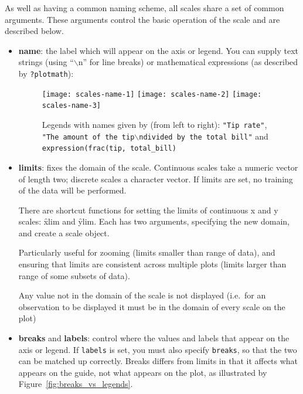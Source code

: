 As well as having a common naming scheme, all scales share a set of common arguments.  These arguments control the basic operation of the scale and are described below.

\begin{itemize}
  \item {\bf name}:  the label which will appear on the axis or legend. You can supply text strings (using ``$\backslash$n'' for line breaks) or mathematical expressions (as described by \verb|?plotmath|):
  
  \begin{figure}[htbp]
    \centering
      \texttt{[image: scales-name-1]}%
      \texttt{[image: scales-name-2]}%
      \texttt{[image: scales-name-3]}
    \caption{Legends with names given by (from left to right): {\tt "Tip rate"}, {\tt "The amount of the tip$\backslash$ndivided by the total bill"} and {\tt expression(frac(tip, total\_bill)} }
    \label{fig:legend-names}
  \end{figure}
  

  \item {\bf limits}: fixes the domain of the scale.   Continuous scales take a numeric vector of length two; discrete scales a character vector. If limits are set, no training of the data will be performed.  
  
  There are shortcut functions for setting the limits of continuous x and y scales: \f{xlim} and \f{ylim}.  Each has two arguments, specifying the new domain, and create a scale object.  
  
  Particularly useful for zooming (limits smaller than range of data), and ensuring that limits are consistent across multiple plots (limits larger than range of some subsets of data).  
  
  Any value not in the domain of the scale is not displayed (i.e.\ for an observation to be displayed it must be in the domain of every scale on the plot)

  \item {\bf breaks} and {\bf labels}: control where the values and labels that appear on the axis or legend. If {\tt labels} is set, you must also specify {\tt breaks}, so that the two can be matched up correctly.  Breaks differs from limits in that it affects what appears on the guide, not what appears on the plot, as illustrated by Figure~\ref{fig:breaks_vs_legends}.
  
\end{itemize}

